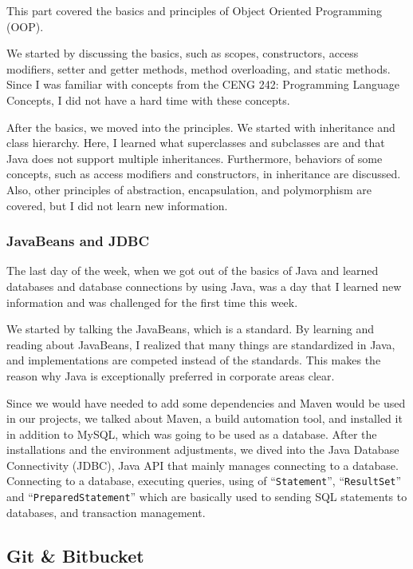 This part covered the basics and principles of Object Oriented Programming (OOP).

We started by discussing the basics, such as scopes, constructors, access modifiers, setter and getter methods, method overloading, and static methods. Since I was familiar with concepts from the CENG 242: Programming Language Concepts, I did not have a hard time with these concepts.

After the basics, we moved into the principles. We started with inheritance and class hierarchy. Here, I learned what superclasses and subclasses are and that Java does not support multiple inheritances. Furthermore, behaviors of some concepts, such as access modifiers and constructors, in inheritance are discussed. Also, other principles of abstraction, encapsulation, and polymorphism are covered, but I did not learn new information.

\subsubsection{JavaBeans and JDBC}

The last day of the week, when we got out of the basics of Java and learned databases and database connections by using Java, was a day that I learned new information and was challenged for the first time this week.

We started by talking the JavaBeans, which is a standard. By learning and reading about JavaBeans, I realized that many things are standardized in Java, and implementations are competed instead of the standards. This makes the reason why Java is exceptionally preferred in corporate areas clear.

Since we would have needed to add some dependencies and Maven would be used in our projects, we talked about Maven, a build automation tool, and installed it in addition to MySQL, which was going to be used as a database. After the installations and the environment adjustments, we dived into the Java Database Connectivity (JDBC), Java API that mainly manages connecting to a database. Connecting to a database, executing queries, using of ``\texttt{Statement}'', ``\texttt{ResultSet}'' and ``\texttt{PreparedStatement}'' which are basically used to sending SQL statements to databases, and transaction management.


\subsection{Git \& Bitbucket}

